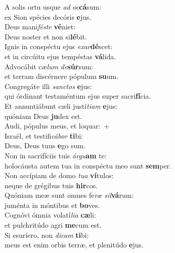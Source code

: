 \evenverse A solis ortu usque \textit{ad} \textit{oc}\textbf{cá}sum:~\*\\
\evenverse ex Sion spécies decóris \textbf{e}jus.\\
\oddverse Deus mani\textit{fé}\textit{ste} \textbf{vé}niet:~\*\\
\oddverse Deus noster et non si\textbf{lé}bit.\\
\evenverse Ignis in conspéctu ejus \textit{e}\textit{xar}\textbf{dé}scet:~\*\\
\evenverse et in circúitu ejus tempéstas \textbf{vá}lida.\\
\oddverse Advocábit cæ\textit{lum} \textit{de}\textbf{súr}sum:~\*\\
\oddverse et terram discérnere pópulum \textbf{su}um.\\
\evenverse Congregáte illi \textit{san}\textit{ctos} \textbf{e}jus:~\*\\
\evenverse qui órdinant testaméntum ejus super sacri\textbf{fí}cia.\\
\oddverse Et annuntiábunt cæli justí\textit{ti}\textit{am} \textbf{e}jus:~\*\\
\oddverse quóniam Deus \textbf{ju}dex est.\\
\evenverse Audi, pópulus meus, et loquar:~+\\
\evenverse  Israël, et testifi\textit{cá}\textit{bor} \textbf{ti}bi:~\*\\
\evenverse Deus, Deus tuus \textbf{e}go sum.\\
\oddverse Non in sacrifíciis tuis \textit{ár}\textit{gu}\textbf{am} te:~\*\\
\oddverse holocáusta autem tua in conspéctu meo sunt \textbf{sem}per.\\
\evenverse Non accípiam de domo \textit{tu}\textit{a} \textbf{ví}tulos:~\*\\
\evenverse neque de grégibus tuis \textbf{hir}cos.\\
\oddverse Quóniam meæ sunt omnes fe\textit{ræ} \textit{sil}\textbf{vá}rum:~\*\\
\oddverse juménta in móntibus et \textbf{bo}ves.\\
\evenverse Cognóvi ómnia volatí\textit{li}\textit{a} \textbf{cæ}li:~\*\\
\evenverse et pulchritúdo agri \textbf{me}cum est.\\
\oddverse Si esuríero, non \textit{di}\textit{cam} \textbf{ti}bi:~\*\\
\oddverse meus est enim orbis terræ, et plenitúdo \textbf{e}jus.\\
